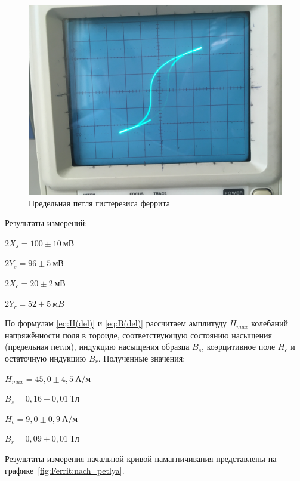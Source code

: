 \documentclass[a4paper, 12pt]{article}
\begin{document}
\begin{figure}[h!]
\begin{center}
    \includegraphics[scale=0.07]{Ferrit.jpg}
\end{center}
\caption{Предельная петля гистерезиса феррита}
\label{fig:Ferrit:petlya}
\end{figure}

Результаты измерений:
\begin{description}
\item{} $2X_s = 100\pm10~мВ$
\item{} $2Y_s = 96\pm5~мВ$
\item{} $2X_c = 20\pm2~мВ$
\item{} $2Y_r = 52\pm5~мB$
\end{description}

По формулам \eqref{eq:H(del)} и \eqref{eq:B(del)} рассчитаем амплитуду $H_{max}$ колебаний напряжённости поля в тороиде, соответствующую состоянию насыщения (предельная петля), индукцию насыщения образца $B_s$, коэрцитивное поле $H_c$ и остаточную индукцию $B_r$. Полученные значения:
\begin{description}
\item{} $H_{max} = 45,0\pm4,5~А/м$
\item{} $B_s = 0,16\pm0,01~Тл$
\item{} $H_c = 9,0\pm0,9~А/м$
\item{} $B_r = 0,09\pm0,01~Тл$
\end{description}

Результаты измерения начальной кривой намагничивания представлены на графике~\ref{fig:Ferrit:nach_petlya}.
\end{document}

